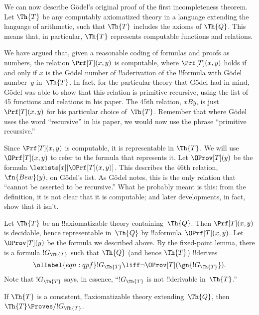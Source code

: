 \documentclass[../../../include/open-logic-section]{subfiles}
\begin{document}


We can now describe G\"odel's original proof of the first
incompleteness theorem. Let $\Th{T}$ be any computably axiomatized theory
in a language extending the language of arithmetic, such that $\Th{T}$
includes the axioms of $\Th{Q}$. This means that, in particular, $\Th{T}$
represents computable functions and relations.

We have argued that, given a reasonable coding of formulas and proofs
as numbers, the relation $\Prf[T](x,y)$ is computable, where
$\Prf[T](x,y)$ holds if and only if $x$ is the G\"odel number of
!!a{derivation} of the !!{formula} with G\"odel number~$y$
in~$\Th{T}$. In fact, for the particular theory that G\"odel had in
mind, G\"odel was able to show that this relation is primitive
recursive, using the list of 45 functions and relations in his
paper. The 45th relation, $x B y$, is just $\Prf[T](x,y)$ for his
particular choice of~$\Th{T}$. Remember that where G\"odel uses the
word ``recursive'' in his paper, we would now use the phrase
``primitive recursive.''

Since $\Prf[T](x,y)$ is computable, it is representable in $\Th{T}$. We
will use $\OPrf[T](x,y)$ to refer to the formula that represents
it. Let $\OProv[T](y)$ be the formula
$\lexists[x][\OPrf[T](x,y)]$. This describes the 46th relation,
$\fn{Bew}(y)$, on G\"odel's list. As G\"odel notes, this is the only
relation that ``cannot be asserted to be recursive.''  What he
probably meant is this: from the definition, it is not clear that it
is computable; and later developments, in fact, show that it isn't.

Let $\Th{T}$ be an !!{axiomatizable} theory containing~$\Th{Q}$. Then
$\Prf[T](x, y)$ is decidable, hence representable in~$\Th{Q}$ by
!!a{formula}~$\OPrf[T](x, y)$. Let $\OProv[T](y)$ be the formula we
described above. By the fixed-point lemma, there is a formula
$!G_\Th{T}$ such that $\Th{Q}$ (and hence $\Th{T}$) !!{derive}s
\begin{equation}
\ollabel{eqn:qpf}
!G_\Th{T} \liff \lnot \OProv[T](\gn{!G_\Th{T}}).
\end{equation}
Note that $!G_\Th{T}$ says, in essence, ``$!G_\Th{T}$ is not
!!{derivable} in~$\Th{T}$.''

\begin{lem}
If $\Th{T}$ is a consistent, !!{axiomatizable} theory
extending~$\Th{Q}$, then $\Th{T} \Proves/ !G_\Th{T}$.
\end{lem}
\end{document}
